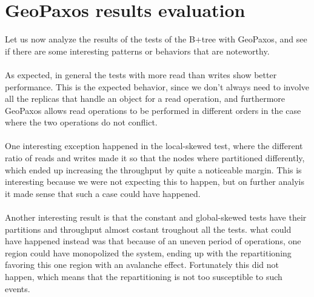 \section{GeoPaxos results evaluation}\label{sec:geopaxos-results-evaluation}
Let us now analyze the results of the tests of the B+tree with GeoPaxos, and see if there are some interesting patterns or behaviors that are noteworthy.
\\\\
As expected, in general the tests with more read than writes show better performance. This is the expected behavior, since we don't always need to involve all the replicas that handle an object for a read operation, and furthermore GeoPaxos allows read operations to be performed in different orders in the case where the two operations do not conflict.
\\\\
One interesting exception happened in the local-skewed test, where the different ratio of reads and writes made it so that the nodes where partitioned differently, which ended up increasing the throughput by quite a noticeable margin. This is interesting because we were not expecting this to happen, but on further analyis it made sense that such a case could have happened.
\\\\
Another interesting result is that the constant and global-skewed tests have their partitions and throughput almost costant troughout all the tests. what could have happened instead was that because of an uneven period of operations, one region could have monopolized the system, ending up with the repartitioning favoring this one region with an avalanche effect. Fortunately this did not happen, which means that the repartitioning is not too susceptible to such events.
\\\\
